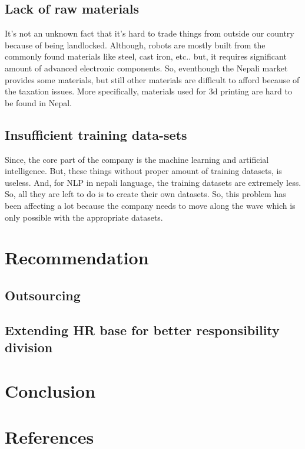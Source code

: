 \documentclass[12pt,a4paper]{scrreprt}
\begin{document}
\section{Lack of raw materials}
It's not an unknown fact that it's hard to trade things from outside our country because of being landlocked. Although, robots are mostly built from the commonly found materials like steel, cast iron, etc.. but, it requires significant amount of advanced electronic components. So, eventhough the Nepali market provides some materials, but still other materials are difficult to afford because of the taxation issues. More specifically, materials used for 3d printing are hard to be found in Nepal. 
\section{Insufficient training data-sets}
Since, the core part of the company is the machine learning and artificial intelligence. But, these things without proper amount of training datasets, is useless. And, for NLP in nepali language, the training datasets are extremely less. So, all they are left to do is to create their own datasets. So, this problem has been affecting a lot because the company needs to move along the wave which is only possible with the appropriate datasets.
\chapter{Recommendation}
\section{Outsourcing}
\section{Extending HR base for better responsibility division}

\chapter{Conclusion}
\chapter*{References}

\end{document}
